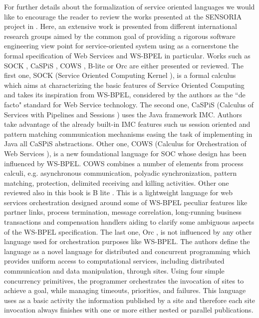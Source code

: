For further details about the formalization of service oriented languages we would like to encourage the reader to review the works presented at the SENSORIA project in \cite{Wirsing2011bis}. Here, an extensive work is presented from different international research groups aimed by the common goal of providing a rigorous software engineering view point for service-oriented system using as a cornerstone the formal specification of Web Services and WS-BPEL in particular. Works such as SOCK \cite{Wirsing2011bis}, CaSPiS \cite{Bettini2008}, COWS \cite{Lapadula2007}, B-lite \cite{Lapadula2008} or Orc \cite{Kitchin2009} are either presented or reviewed. The first one, SOCK (Service Oriented Computing Kernel \cite{Wirsing2011bis}), is a formal calculus which aims at characterizing the basic features of Service Oriented Computing and takes its inspiration from WS-BPEL, considered by the authors as the ``de facto" standard for Web Service technology. The second one, CaSPiS (Calculus of Services with Pipelines and Sessions \cite{Bettini2008}) uses the Java framework IMC. Authors take advantage of the already built-in IMC features such us session oriented and pattern matching communication mechanisms easing the task of implementing in Java all CaSPiS abstractions. Other one, COWS (Calculus for Orchestration of Web Services \cite{Lapadula2007}), is a new foundational language for SOC whose design has been influenced by WS-BPEL. COWS combines a number of elements from process calculi, e.g. asynchronous communication, polyadic synchronization, pattern matching, protection, delimited receiving and killing activities. 
Other one reviewed also in this book is B lite \cite{Lapadula2008}. This is a lightweight language for web services orchestration designed around some of WS-BPEL peculiar features like partner links, process termination, message correlation, long-running business transactions and compensation handlers aiding to clarify some ambiguous aspects of the WS-BPEL specification. The last one, Orc \cite{Kitchin2009}, is not influenced by any other language used for orchestration purposes like WS-BPEL. The authors define the language as a novel language for distributed and concurrent programming which provides uniform access to computational services, including distributed communication and data manipulation, through sites. Using four simple concurrency primitives, the programmer orchestrates the invocation of sites to achieve a goal, while managing timeouts, priorities, and failures. This language uses as a basic activity the information published by a site and therefore each site invocation always finishes with one or more either nested or parallel publications.

